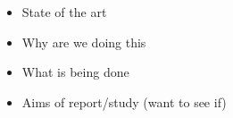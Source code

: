 \begin{itemize}
	\item State of the art
	\item Why are we doing this
	\item What is being done
	\item Aims of report/study (want to see if)
\end{itemize}
